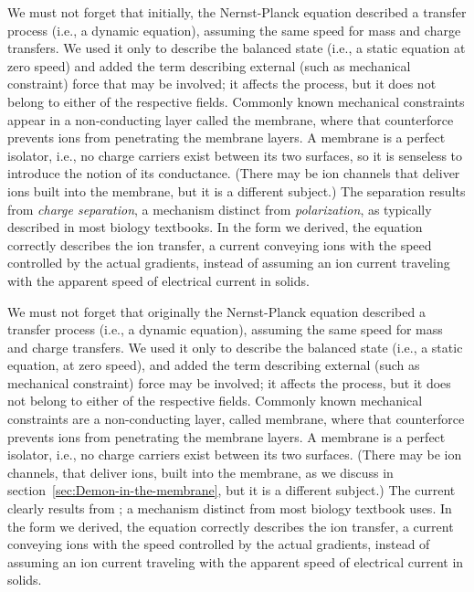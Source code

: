 We must not forget that initially, the Nernst-Planck equation described
a transfer process (i.e., a dynamic equation), assuming the same speed for mass and
charge transfers. We used it only to describe the balanced state (i.e., a static equation at zero speed) and added the term describing external (such as mechanical constraint) force that
may be involved; it affects the process, but it does not belong to either of the respective fields. Commonly known mechanical constraints appear in a non-conducting layer called the membrane, where that counterforce prevents ions from penetrating the membrane layers.
A membrane is a perfect isolator, i.e., no charge carriers exist
between its two surfaces, so it is senseless to introduce the notion of its conductance. (There may be ion channels that deliver ions built into the membrane, but it is a different subject.) The separation results from \textit{charge separation}, a mechanism distinct from \textit{polarization}, as typically described in most biology textbooks.
In the form we derived, the equation correctly describes 
the ion transfer, a current conveying ions with the speed controlled by the actual gradients, instead of assuming an ion current traveling 
with the apparent speed of electrical current in solids.


We must not forget that originally the Nernst-Planck equation described
a transfer process (i.e., a dynamic equation), assuming the same speed for mass and
charge transfers. We used it only to describe the balanced state (i.e., a static equation, at zero speed), and added the term describing external (such as mechanical constraint) force
may be involved; it affects the process, but it does not belong to either of the respective fields. Commonly known mechanical constraints are a non-conducting layer, called membrane, where that counterforce prevents ions from penetrating the membrane layers.
A membrane is a perfect isolator, i.e., no charge carriers exist
between its two surfaces. (There may be ion channels, that deliver ions, built into the membrane, as we discuss in section~\ref{sec:Demon-in-the-membrane}, but it is a different subject.) The current clearly results from ; a mechanism distinct from  most biology textbook uses.
In the form we derived, the equation correctly describes 
the ion transfer, a current conveying ions with the speed controlled by the actual gradients, instead of assuming an ion current traveling 
with the apparent speed of electrical current in solids.



